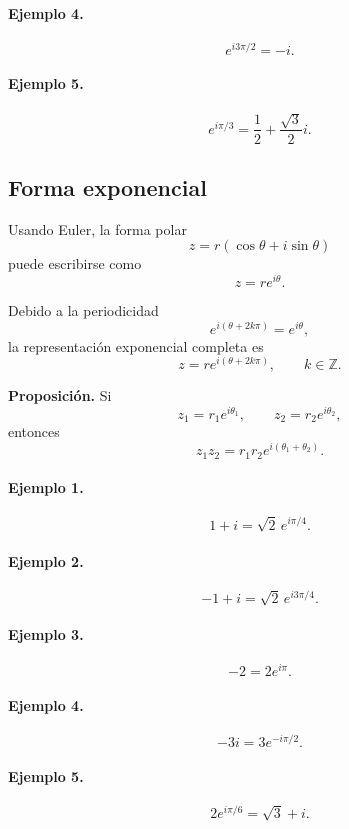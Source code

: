 \paragraph{Ejemplo 4.}
\[
e^{i3\pi/2}=-i.
\]

\paragraph{Ejemplo 5.}
\[
e^{i\pi/3}
=
\frac12+\frac{\sqrt3}{2}i.
\]

\subsection{Forma exponencial}

Usando Euler, la forma polar
\[
z=r(\cos\theta+i\sin\theta)
\]
puede escribirse como
\[
\boxed{
z=re^{i\theta}.
}
\]

Debido a la periodicidad
\[
e^{i(\theta+2k\pi)}
=
e^{i\theta},
\]
la representación exponencial completa es
\[
\boxed{
z=re^{i(\theta+2k\pi)},
\qquad
k\in\mathbb{Z}.
}
\]

\textbf{Proposición.}
Si
\[
z_1=r_1e^{i\theta_1},
\qquad
z_2=r_2e^{i\theta_2},
\]
entonces
\[
z_1z_2
=
r_1r_2e^{i(\theta_1+\theta_2)}.
\]

\paragraph{Ejemplo 1.}
\[
1+i
=
\sqrt2\,e^{i\pi/4}.
\]

\paragraph{Ejemplo 2.}
\[
-1+i
=
\sqrt2\,e^{i3\pi/4}.
\]

\paragraph{Ejemplo 3.}
\[
-2
=
2e^{i\pi}.
\]

\paragraph{Ejemplo 4.}
\[
-3i
=
3e^{-i\pi/2}.
\]

\paragraph{Ejemplo 5.}
\[
2e^{i\pi/6}
=
\sqrt3+i.
\]

